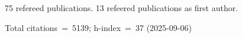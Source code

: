 75 refereed publications. 13 refeered publications as first author.

Total citations~=~5139; h-index~=~37 (2025-09-06)